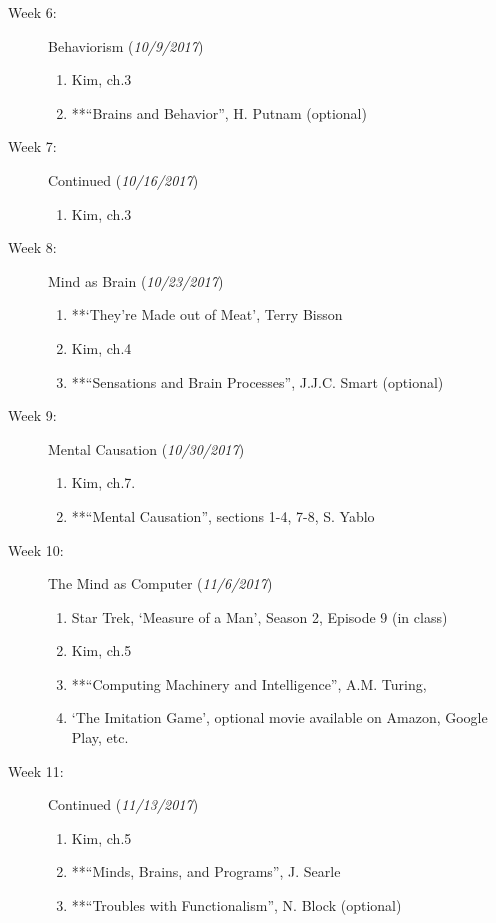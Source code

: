 \documentclass[article,oneside]{memoir}
\begin{document}
\begin{description}
\item[Week 6: ] Behaviorism  (\emph{10/9/2017})
\begin{enumerate}
\item Kim, ch.3
\item **``Brains and Behavior'', H. Putnam (optional)
 \end{enumerate}
 
\item[Week 7:] Continued  (\emph{10/16/2017})
\begin{enumerate}
\item Kim, ch.3
\end{enumerate}

\item[Week 8:] Mind as Brain (\emph{10/23/2017})
\begin{enumerate}
\item **`They're Made out of Meat', Terry Bisson
\item Kim, ch.4
\item **``Sensations and Brain Processes'', J.J.C. Smart (optional)
\end{enumerate}

\item[Week 9:] Mental Causation (\emph{10/30/2017})
\begin{enumerate}
\item Kim, ch.7. 
\item **``Mental Causation'', sections 1-4, 7-8, S. Yablo
\end{enumerate}


\item[Week 10:] The Mind as Computer (\emph{11/6/2017})
\begin{enumerate}
\item Star Trek, ‘Measure of a Man’, Season 2, Episode 9 (in class)
\item Kim, ch.5
\item **``Computing Machinery and Intelligence'', A.M. Turing, 
\item `The Imitation Game', optional movie available on Amazon, Google Play, etc. \end{enumerate}

\item[Week 11:] Continued  (\emph{11/13/2017})
\begin{enumerate}
\item Kim, ch.5
\item**``Minds, Brains, and Programs'', J.  Searle
\item **``Troubles with Functionalism'', N. Block (optional)
\end{enumerate}


\end{description}
\end{document}
